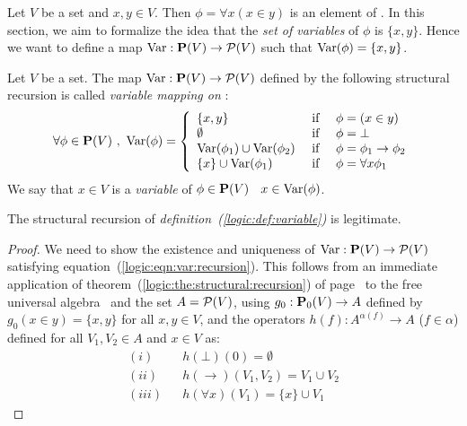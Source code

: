 Let $V$ be a set and $x,y\in V$. Then $\phi=\forall x(x\in y)$ is an
element of \pv. In this section, we aim to formalize the idea that
the {\em set of variables} of $\phi$ is $\{x,y\}$. Hence we want to
define a map $\mbox{\rm Var}:\mbox{${\bf P}(V)$}\to{\cal P}(V)$ such that
$\mbox{\rm Var}(\phi)=\{x,y\}$.
\begin{defin}\label{logic:def:variable}
Let $V$ be a set. The map $\mbox{\rm Var}:\mbox{${\bf P}(V)$}\to {\cal P}(V)$ defined by the
following structural recursion is called {\em variable mapping on
\pv}:
 \begin{equation}\label{logic:eqn:var:recursion}
    \forall\phi\in\pv\ ,\ \var(\phi)=\left\{
                    \begin{array}{lcl}
                    \{x,y\}&\mbox{\ if\ }&\phi=(x\in y)\\
                    \emptyset&\mbox{\ if\ }&\phi=\bot\\
                    \var(\phi_{1})\cup\var(\phi_{2}) &\mbox{\ if\ }&\phi=\phi_{1}\to\phi_{2}\\
                    \{x\}\cup\var(\phi_{1})&\mbox{\ if\ }&\phi=\forall x\phi_{1}
                    \end{array}\right.
    \end{equation}
We say that $x\in V$ is a {\em variable} of $\phi\in\mbox{${\bf P}(V)$}$ \ifand\ $x\in\mbox{\rm Var}(\phi)$.
\end{defin}
\begin{prop}\label{logic:prop:variable}
The structural recursion of {\em definition~(\ref{logic:def:variable})} is legitimate.
\end{prop}
\begin{proof}
We need to show the existence and uniqueness of $\mbox{\rm Var}:\mbox{${\bf P}(V)$}\to{\cal
P}(V)$ satisfying equation~(\ref{logic:eqn:var:recursion}). This
follows from an immediate application of
theorem~(\ref{logic:the:structural:recursion}) of
page~\pageref{logic:the:structural:recursion} to the free universal
algebra \pv\ and the set $A={\cal P}(V)$, using $g_{0}:\mbox{${\bf P}_{0}(V)$}\to A$
defined by $g_{0}(x\in y)=\{x,y\}$ for all $x,y\in V$, and the
operators $h(f):A^{\alpha(f)}\to A$ ($f\in\alpha$) defined for all
$V_{1},V_{2}\in A$ and $x\in V$ as:
    \begin{eqnarray*}
    (i)&&h(\bot)(0)=\emptyset\\
    (ii)&&h(\to)(V_{1},V_{2})=V_{1}\cup V_{2}\\
    (iii)&&h(\forall x)(V_{1})=\{x\}\cup V_{1}
    \end{eqnarray*}
\end{proof}

